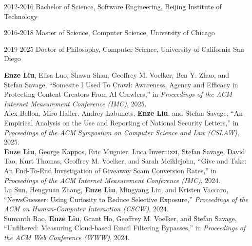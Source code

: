 \documentclass[12pt]{ucsddissertation}
\begin{document}
\begin{vita}
\noindent
\begin{cv}{}
\begin{cvlist}{}
\item[2012-2016] Bachelor of Science, Software Engineering, Beijing Institute of Technology
\item[2016-2018] Master of Science, Computer Science, University of Chicago
\item[2019-2025] Doctor of Philosophy, Computer Science, University of California San Diego

\end{cvlist}
\end{cv}

\publications


\noindent \textbf{Enze Liu}, Elisa Luo, Shawn Shan, Geoffrey M. Voelker, Ben Y. Zhao, and Stefan Savage, ``Somesite I Used To Crawl: Awareness, Agency and Efficacy in Protecting Content Creators From AI Crawlers,'' in \textit{Proceedings of the ACM Internet Measurement Conference (IMC)}, 2025.\\

\noindent Alex Bellon, Miro Haller, Andrey Labunets, \textbf{Enze Liu}, and Stefan Savage, ``An Empirical Analysis on the Use and Reporting of National Security Letters,'' in \textit{Proceedings of the ACM Symposium on Computer Science and Law (CSLAW)}, 2025.\\


\noindent \textbf{Enze Liu}, George Kappos, Eric Mugnier, Luca Invernizzi, Stefan Savage, David Tao, Kurt Thomas, Geoffrey M. Voelker, and Sarah Meiklejohn, ``Give and Take: An End-To-End Investigation of Giveaway Scam Conversion Rates,'' in \textit{Proceedings of the ACM Internet Measurement Conference (IMC)}, 2024.\\

\noindent Lu Sun, Hengyuan Zhang, \textbf{Enze Liu}, Mingyang Liu, and Kristen Vaccaro, ``NewsGuesser: Using Curiosity to Reduce Selective Exposure,'' \textit{Proceedings of the ACM on Human-Computer Interaction (CSCW)}, 2024.\\

\noindent Sumanth Rao, \textbf{Enze Liu}, Grant Ho, Geoffrey M. Voelker, and Stefan Savage, ``Unfiltered: Measuring Cloud-based Email Filtering Bypasses,'' in \textit{Proceedings of the ACM Web Conference (WWW)}, 2024.\\


\end{vita}
\end{document}
